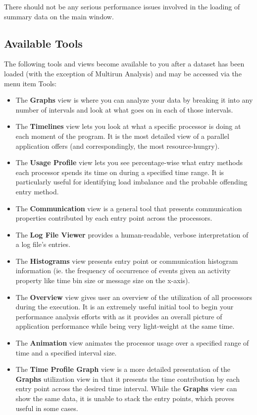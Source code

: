 \documentclass[10pt]{report}
\begin{document}
There should not be any serious performance issues involved in the
loading of summary data on the main window.

\subsection{Available Tools}
\label{sec::available tools}

The following tools and views become available to you after a dataset
has been loaded (with the exception of Multirun Analysis) and may be
accessed via the menu item Tools:

\begin{itemize}
\item 
The {\bf Graphs} view is where you can analyze your data by breaking it
into any number of intervals and look at what goes on in each of those
intervals.
\item
The {\bf Timelines} view lets you look at what a specific processor is
doing at each moment of the program. It is the most detailed view of a
parallel application \projections{} offers (and correspondingly, the
most resource-hungry).
\item
The {\bf Usage Profile} view lets you see percentage-wise what entry
methods each processor spends its time on during a specified time range.
It is particularly useful for identifying load imbalance and the probable
offending entry method.
\item
The {\bf Communication} view is a general tool that presents
communication properties contributed by each entry point across the
processors.
\item
The {\bf Log File Viewer} provides a human-readable, verbose
interpretation of a log file's entries.
\item
The {\bf Histograms} view presents entry point or communication
histogram information (ie. the frequency of occurrence of events given
an activity property like time bin size or message size on the
x-axis).
\item
The {\bf Overview} view gives user an overview of the utilization of
all processors during the execution. It is an extremely useful initial
tool to begin your performance analysis efforts with as it provides an
overall picture of application performance while being very
light-weight at the same time.
\item
The {\bf Animation} view animates the processor usage over a specified
range of time and a specified interval size.
\item
The {\bf Time Profile Graph} view is a more detailed presentation of
the {\bf Graphs} utilization view in that it presents the time
contribution by each entry point across the desired time
interval. While the {\bf Graphs} view can show the same data, it is
unable to stack the entry points, which proves useful in some cases.
\end{itemize}
\end{document}
